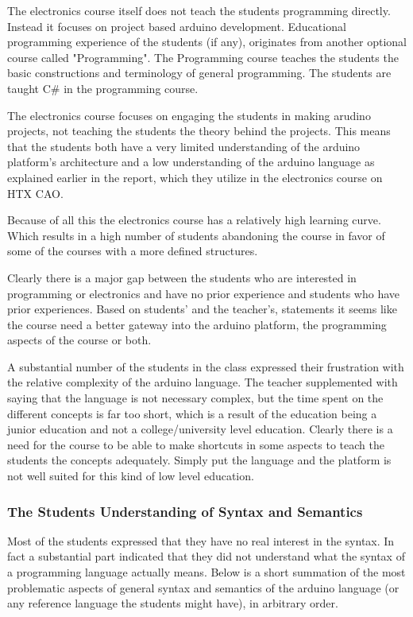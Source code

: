 The electronics course itself does not teach the students programming directly. 
Instead it focuses on project based arduino development. 
Educational programming experience of the students (if any), originates from another optional course called "Programming". 
The Programming course teaches the students the basic constructions and terminology of general programming. 
The students are taught C{\#} in the programming course. 

The electronics course focuses on engaging the students in making arudino projects, not teaching the students the theory behind the projects. 
This means that the students both have a very limited understanding of the arduino platform's architecture and a low understanding of the arduino language as explained earlier in the report, which they utilize in the electronics course on HTX CAO.

Because of all this the electronics course has a relatively high learning curve. 
Which results in a high number of students abandoning the course in favor of some of the courses with a more defined structures.

Clearly there is a major gap between the students who are interested in programming or electronics and have no prior experience and students who have prior experiences. 
Based on students' and the teacher's, statements it seems like the course need a better gateway into the arduino platform, the programming aspects of the course or both.

A substantial number of the students in the class expressed their frustration with the relative complexity of the arduino language. 
The teacher supplemented with saying that the language is not necessary complex, but the time spent on the different concepts is far too short, which is a result of the education being a junior education and not a college/university level education.
Clearly there is a need for the course to be able to make shortcuts in some aspects to teach the students the concepts adequately. 
Simply put the language and the platform is not well suited for this kind of low level education.

\subsubsection{The Students Understanding of Syntax and Semantics}
Most of the students expressed that they have no real interest in the syntax. 
In fact a substantial part indicated that they did not understand what the syntax of a programming language actually means. 
Below is a short summation of the most problematic aspects of general syntax and semantics of the arduino language (or any reference language the students might have), in arbitrary order.

